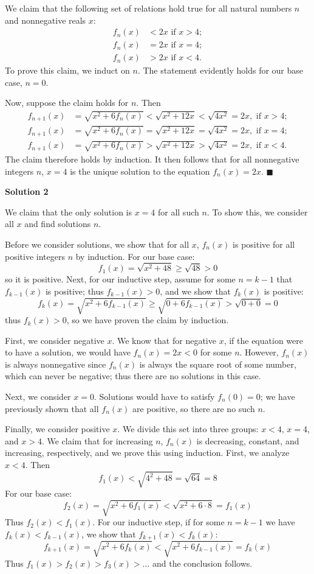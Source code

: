 \begin{enumerate}
 We claim that the following set of relations hold true for all natural numbers $n$ and nonnegative reals $x$:
 \begin{align*} f_n(x) &< 2x \text{ if }x>4 ; \\ f_n(x) &= 2x \text{ if }x=4 ; \\ f_n(x) &> 2x \text{ if }x<4 . \end{align*}
To prove this claim, we induct on $n$.  The statement evidently holds for our base case, $n=0$.

 Now, suppose the claim holds for $n$.  Then
 \begin{align*} f_{n+1}(x) &= \sqrt{x^2 + 6f_n(x)} < \sqrt{x^2+12x} < \sqrt{4x^2} = 2x, \text{ if } x>4 ; \\ f_{n+1}(x) &= \sqrt{x^2 + 6f_n(x)} = \sqrt{x^2 + 12x} = \sqrt{4x^2} = 2x, \text{ if } x=4 ; \\ f_{n+1}(x) &= \sqrt{x^2 + 6f_n(x)} > \sqrt{x^2+12x} > \sqrt{4x^2} = 2x, \text{ if } x<4 . \end{align*}
The claim therefore holds by induction.  It then follows that for all nonnegative integers $n$, $x=4$ is the unique solution to the equation $f_n(x) = 2x$.  $\blacksquare$




\textbf{Solution 2}

We claim that the only solution is $\boxed{x=4}$ for all such $n$. To show this, we consider all $x$ and find solutions $n$.

 Before we consider solutions, we show that for all $x$, $f_n(x)$ is positive for all positive integers $n$ by induction. For our base case:
 \[f_1(x)=\sqrt{x^2+48}\ge\sqrt{48}>0\]so it is positive. Next, for our inductive step, assume for some $n=k-1$ that $f_{k-1}(x)$ is positive; thus $f_{k-1}(x)>0$, and we show that $f_k(x)$ is positive:
 \[f_k(x)=\sqrt{x^2+6f_{k-1}(x)}\ge\sqrt{0+6f_{k-1}(x)}>\sqrt{0+0}=0\]thus $f_k(x)>0$, so we have proven the claim by induction.

 First, we consider negative $x$. We know that for negative $x$, if the equation were to have a solution, we would have $f_n(x)=2x<0$ for some $n$. However, $f_n(x)$ is always nonnegative since $f_n(x)$ is always the square root of some number, which can never be negative; thus there are no solutions in this case.

 Next, we consider $x=0$. Solutions would have to satisfy $f_n(0)=0$; we have previously shown that all $f_n(x)$ are positive, so there are no such $n$.

 Finally, we consider positive $x$. We divide this set into three groups: $x<4$, $x=4$, and $x>4$. We claim that for increasing $n$, $f_n(x)$ is decreasing, constant, and increasing, respectively, and we prove this using induction. First, we analyze $x<4$. Then
 \[f_1(x)<\sqrt{4^2+48}=\sqrt{64}=8\]For our base case:
 \[f_2(x)=\sqrt{x^2+6f_1(x)}<\sqrt{x^2+6\cdot8}=f_1(x)\]Thus $f_2(x)<f_1(x)$. For our inductive step, if for some $n=k-1$ we have $f_k(x)<f_{k-1}(x)$, we show that $f_{k+1}(x)<f_k(x)$:
 \[f_{k+1}(x)=\sqrt{x^2+6f_k(x)}<\sqrt{x^2+6f_{k-1}(x)}=f_k(x)\]Thus $f_1(x)>f_2(x)>f_3(x)>\ldots$ and the conclusion follows.


\end{enumerate}
